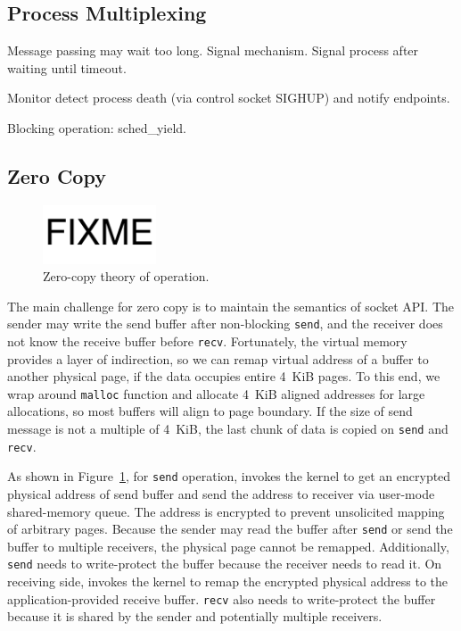 \subsection{Process Multiplexing}
\label{subsec:epoll}


Message passing may wait too long.
Signal mechanism. Signal process after waiting until timeout.

Monitor detect process death (via control socket SIGHUP) and notify endpoints.

Blocking operation: sched\_yield.


\subsection{Zero Copy}
\label{subsec:zerocopy}

\begin{figure}[t]
	\centering
	\includegraphics[width=0.3\textwidth]{images/fixme}
	\caption{Zero-copy theory of operation.}
	\label{fig:zerocopy}
\end{figure}

The main challenge for zero copy is to maintain the semantics of socket API. The sender may write the send buffer after non-blocking \texttt{send}, and the receiver does not know the receive buffer before \texttt{recv}.
Fortunately, the virtual memory provides a layer of indirection, so we can remap virtual address of a buffer to another physical page, if the data occupies entire 4~KiB pages.
To this end, we wrap around \texttt{malloc} function and allocate 4~KiB aligned addresses for large allocations, so most buffers will align to page boundary.
If the size of send message is not a multiple of 4~KiB, the last chunk of data is copied on \texttt{send} and \texttt{recv}.

As shown in Figure~\ref{fig:zerocopy}, for \texttt{send} operation, \libipc{} invokes the kernel to get an encrypted physical address of send buffer and send the address to receiver via user-mode shared-memory queue.
The address is encrypted to prevent unsolicited mapping of arbitrary pages.
Because the sender may read the buffer after \texttt{send} or send the buffer to multiple receivers, the physical page cannot be remapped.
Additionally, \texttt{send} needs to write-protect the buffer because the receiver needs to read it.
On receiving side, \libipc{} invokes the kernel to remap the encrypted physical address to the application-provided receive buffer.
\texttt{recv} also needs to write-protect the buffer because it is shared by the sender and potentially multiple receivers.

